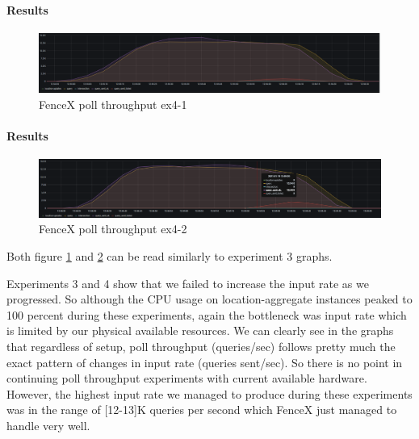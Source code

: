 \documentclass[a4]{report}
\begin{document}
        \paragraph{Results}
        \begin{figure}[ht]
            \caption{FenceX poll throughput ex4-1}
            \label{fig:ex4-1}
            \includegraphics[scale=0.4]{images/evaluation/ex4-benchmarking(19,10).png}
        \end{figure}

        \paragraph{Results}
        \begin{figure}[ht]
            \caption{FenceX poll throughput ex4-2}
            \label{fig:ex4-2}
            \includegraphics[scale=0.4]{images/evaluation/ex4-benchmarking(22,10).png}
        \end{figure}

        Both figure \ref{fig:ex4-1} and \ref{fig:ex4-2} can be read similarly to experiment 3 graphs.

        Experiments 3 and 4 show that we failed to increase the input rate as we progressed.
        So although the CPU usage on location-aggregate instances peaked to 100 percent during these experiments,
        again the bottleneck was input rate which is limited by our physical available resources.
        We can clearly see in the graphs that regardless of setup, poll throughput (queries/sec) follows pretty
        much the exact pattern of changes in input rate (queries sent/sec).
        So there is no point in continuing poll throughput experiments with current available hardware.
        However, the highest input rate we managed to produce during these experiments was in the range of [12-13]K queries
        per second which FenceX just managed to handle very well.
\end{document}

